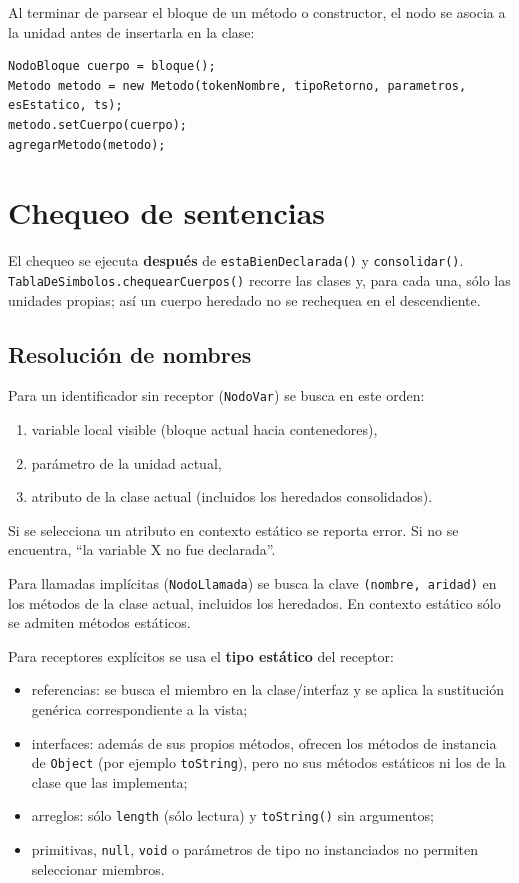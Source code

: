 \documentclass[11pt,a4paper]{article}
\begin{document}
Al terminar de parsear el bloque de un método o constructor, el nodo se asocia a
la unidad antes de insertarla en la clase:

{\footnotesize
\begin{verbatim}
NodoBloque cuerpo = bloque();
Metodo metodo = new Metodo(tokenNombre, tipoRetorno, parametros, esEstatico, ts);
metodo.setCuerpo(cuerpo);
agregarMetodo(metodo);
\end{verbatim}
}

\section{Chequeo de sentencias}

El chequeo se ejecuta \textbf{después} de \texttt{estaBienDeclarada()} y
\texttt{consolidar()}. \texttt{TablaDeSimbolos.chequearCuerpos()} recorre las
clases y, para cada una, sólo las unidades propias; así un cuerpo heredado no se
rechequea en el descendiente.

\subsection{Resolución de nombres}

Para un identificador sin receptor (\texttt{NodoVar}) se busca en este orden:

\begin{enumerate}
  \item variable local visible (bloque actual hacia contenedores),
  \item parámetro de la unidad actual,
  \item atributo de la clase actual (incluidos los heredados consolidados).
\end{enumerate}

Si se selecciona un atributo en contexto estático se reporta error. Si no se
encuentra, ``la variable X no fue declarada''.

Para llamadas implícitas (\texttt{NodoLlamada}) se busca la clave
\texttt{(nombre, aridad)} en los métodos de la clase actual, incluidos los
heredados. En contexto estático sólo se admiten métodos estáticos.

Para receptores explícitos se usa el \textbf{tipo estático} del receptor:

\begin{itemize}
  \item referencias: se busca el miembro en la clase/interfaz y se aplica la
        sustitución genérica correspondiente a la vista;
  \item interfaces: además de sus propios métodos, ofrecen los métodos de
        instancia de \texttt{Object} (por ejemplo \texttt{toString}), pero no sus
        métodos estáticos ni los de la clase que las implementa;
  \item arreglos: sólo \texttt{length} (sólo lectura) y \texttt{toString()} sin
        argumentos;
  \item primitivas, \texttt{null}, \texttt{void} o parámetros de tipo no
        instanciados no permiten seleccionar miembros.
\end{itemize}
\end{document}
